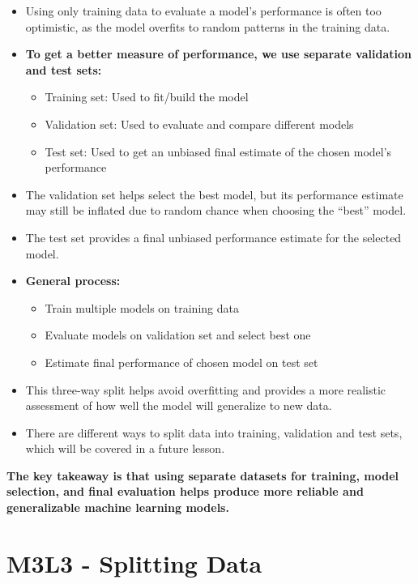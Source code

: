 \documentclass[
]{book}
\providecommand{\tightlist}{%
  \setlength{\itemsep}{0pt}\setlength{\parskip}{0pt}}
\begin{document}
\begin{itemize}
\tightlist
\item
  Using only training data to evaluate a model's performance is often too optimistic, as the model overfits to random patterns in the training data.
\item
  \textbf{To get a better measure of performance, we use separate validation and test sets:}

  \begin{itemize}
  \tightlist
  \item
    Training set: Used to fit/build the model
  \item
    Validation set: Used to evaluate and compare different models
  \item
    Test set: Used to get an unbiased final estimate of the chosen model's performance
  \end{itemize}
\item
  The validation set helps select the best model, but its performance estimate may still be inflated due to random chance when choosing the ``best'' model.
\item
  The test set provides a final unbiased performance estimate for the selected model.
\item
  \textbf{General process:}

  \begin{itemize}
  \tightlist
  \item
    Train multiple models on training data
  \item
    Evaluate models on validation set and select best one
  \item
    Estimate final performance of chosen model on test set
  \end{itemize}
\item
  This three-way split helps avoid overfitting and provides a more realistic assessment of how well the model will generalize to new data.
\item
  There are different ways to split data into training, validation and test sets, which will be covered in a future lesson.
\end{itemize}

\textbf{The key takeaway is that using separate datasets for training, model selection, and final evaluation helps produce more reliable and generalizable machine learning models.}

\section{M3L3 - Splitting Data}\label{m3l3---splitting-data}
\end{document}
